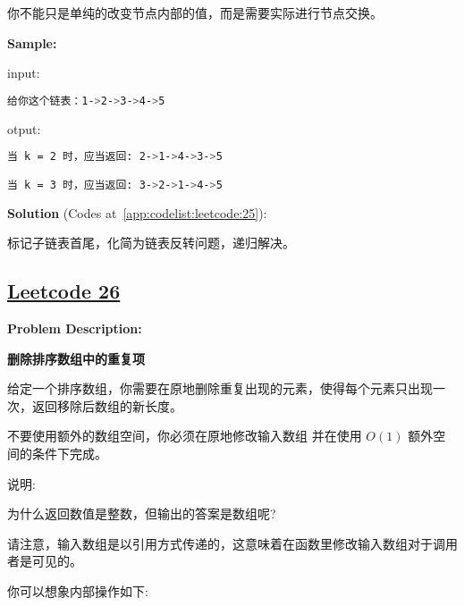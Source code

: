 你不能只是单纯的改变节点内部的值，而是需要实际进行节点交换。\par


\textbf{Sample:}\par

input:\par

\begin{lstlisting}[language=bash]
给你这个链表：1->2->3->4->5
\end{lstlisting}

otput:\par

\begin{lstlisting}[language=bash]
当 k = 2 时，应当返回: 2->1->4->3->5

当 k = 3 时，应当返回: 3->2->1->4->5
\end{lstlisting}

\textbf{Solution }(Codes at~\ref{app:codelist:leetcode:25}):\par

标记子链表首尾，化简为链表反转问题，递归解决。\par



\subsection{\href{https://leetcode-cn.com/}{Leetcode 26}}\label{app:problemlist:leetcode:26}

\textbf{Problem Description:}\par

\textbf{删除排序数组中的重复项}\par

给定一个排序数组，你需要在原地删除重复出现的元素，使得每个元素只出现一次，返回移除后数组的新长度。\par

不要使用额外的数组空间，你必须在原地修改输入数组 并在使用 $ O(1) $ 额外空间的条件下完成。\par

说明:\par

为什么返回数值是整数，但输出的答案是数组呢?\par

请注意，输入数组是以引用方式传递的，这意味着在函数里修改输入数组对于调用者是可见的。\par

你可以想象内部操作如下:\par

